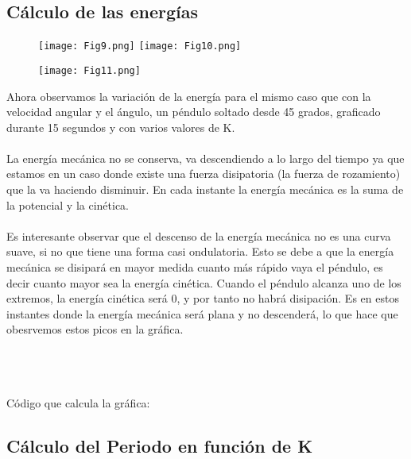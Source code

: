 \documentclass{article}
\begin{document}
\subsection{Cálculo de las energías}

\begin{figure}[h]
\centering
\hspace*{-2.3cm}
\texttt{[image: Fig9.png]}\hfill
\texttt{[image: Fig10.png]}
\hspace*{-2.3cm}
\end{figure}
\begin{figure}[h]
\centering
\texttt{[image: Fig11.png]}
\end{figure}

Ahora observamos la variación de la energía para el mismo caso que con la velocidad angular y el ángulo, un péndulo soltado desde 45 grados, graficado durante 15 segundos y con varios valores de K. \\ \\La energía mecánica no se conserva, va descendiendo a lo largo del tiempo ya que estamos en un caso donde existe una fuerza disipatoria (la fuerza de rozamiento) que la va haciendo disminuir. En cada instante la energía mecánica es la suma de la potencial y la cinética. \\ \\Es interesante observar que el descenso de la energía mecánica no es una curva suave, si no que tiene una forma casi ondulatoria. Esto se debe a que la energía mecánica se disipará en mayor medida cuanto más rápido vaya el péndulo, es decir cuanto mayor sea la energía cinética. Cuando el péndulo alcanza uno de los extremos, la energía cinética será 0, y por tanto no habrá disipación. Es en estos instantes donde la energía mecánica será plana y no descenderá, lo que hace que obesrvemos estos picos en la gráfica.

\pagebreak
\hfill \break \\
\hfill \break \\
\hfill \break \\
Código que calcula la gráfica:



\pagebreak

\subsection{Cálculo del Periodo en función de K}
\end{document}
